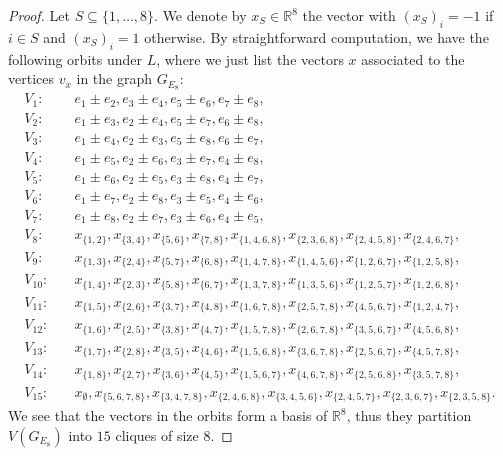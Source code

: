 \documentclass[11pt]{article}
\theoremstyle{definition}
\numberwithin{equation}{section}
\begin{document}
\begin{proof}
Let $S\subseteq \{1,\dots, 8\}$. We denote by $x_S\in \mathbb{R}^8$ the vector with $(x_S)_i=-1$ if $i\in S$ and $(x_S)_i=1$ otherwise. By straightforward computation, we have the following orbits under $L$, where we just list the vectors $x$ associated to the vertices $v_x$ in the graph $G_{E_8}$:
\begin{align} \label{vertexpartition}
   V_1:\quad &e_1 \pm e_2, e_3 \pm e_4, e_5 \pm e_6, e_7 \pm e_8,\\
   V_2:\quad &e_1 \pm e_3, e_2 \pm e_4, e_5 \pm e_7, e_6 \pm e_8,\nonumber\\
   V_3:\quad &e_1 \pm e_4, e_2 \pm e_3, e_5 \pm e_8, e_6 \pm e_7,\nonumber\\
   V_4:\quad &e_1 \pm e_5, e_2 \pm e_6, e_3 \pm e_7, e_4 \pm e_8,\nonumber\\
   V_5:\quad &e_1 \pm e_6, e_2 \pm e_5, e_3 \pm e_8, e_4 \pm e_7,\nonumber\\
   V_6:\quad &e_1 \pm e_7, e_2 \pm e_8, e_3 \pm e_5, e_4 \pm e_6,\nonumber\\
   V_7:\quad &e_1 \pm e_8, e_2 \pm e_7, e_3 \pm e_6, e_4 \pm e_5,\nonumber\\
   V_8:\quad &x_{\{1,2\}}, x_{\{3,4\}},x_{\{5,6\}},x_{\{7,8\}},x_{\{1,4,6,8\}}, x_{\{2,3,6,8\}},x_{\{2,4,5,8\}},x_{\{2,4,6,7\}},\nonumber\\
   V_9:\quad  &x_{\{1,3\}}, x_{\{2,4\}},x_{\{5,7\}},x_{\{6,8\}},x_{\{1,4,7,8\}}, x_{\{1,4,5,6\}},x_{\{1,2,6,7\}},x_{\{1,2,5,8\}},\nonumber\\
   V_{10}:\quad  &x_{\{1,4\}}, x_{\{2,3\}},x_{\{5,8\}},x_{\{6,7\}},x_{\{1,3,7,8\}}, x_{\{1,3,5,6\}},x_{\{1,2,5,7\}},x_{\{1,2,6,8\}},\nonumber\\
   V_{11}:\quad  &x_{\{1,5\}}, x_{\{2,6\}},x_{\{3,7\}},x_{\{4,8\}},x_{\{1,6,7,8\}}, x_{\{2,5,7,8\}},x_{\{4,5,6,7\}},x_{\{1,2,4,7\}},\nonumber\\
   V_{12}:\quad  &x_{\{1,6\}}, x_{\{2,5\}},x_{\{3,8\}},x_{\{4,7\}},x_{\{1,5,7,8\}}, x_{\{2,6,7,8\}},x_{\{3,5,6,7\}},x_{\{4,5,6,8\}},\nonumber\\
   V_{13}:\quad  &x_{\{1,7\}}, x_{\{2,8\}},x_{\{3,5\}},x_{\{4,6\}},x_{\{1,5,6,8\}}, x_{\{3,6,7,8\}},x_{\{2,5,6,7\}},x_{\{4,5,7,8\}},\nonumber\\
   V_{14}:\quad  &x_{\{1,8\}}, x_{\{2,7\}},x_{\{3,6\}},x_{\{4,5\}},x_{\{1,5,6,7\}}, x_{\{4,6,7,8\}},x_{\{2,5,6,8\}},x_{\{3,5,7,8\}},\nonumber\\
   V_{15}:\quad  &x_\emptyset, x_{\{5,6,7,8\}},x_{\{3,4,7,8\}},x_{\{2,4,6,8\}},x_{\{3,4,5,6\}}, x_{\{2,4,5,7\}},x_{\{2,3,6,7\}},x_{\{2,3,5,8\}}.\nonumber
\end{align}
We see that the vectors in the orbits form a basis of $\mathbb{R}^8$, thus they partition $V(G_{E_8})$ into $15$ cliques of size $8$.
\end{proof}
\end{document}

